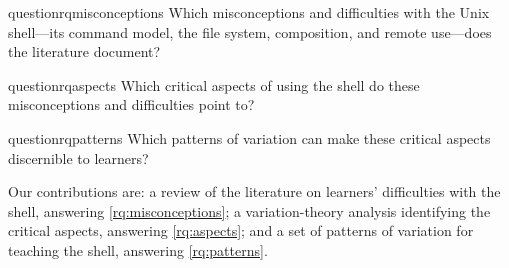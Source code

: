 \begin{frame}
\begin{restatable}{question}{rqmisconceptions}\label{rq:misconceptions}
  Which misconceptions and difficulties with the Unix shell---its command
  model, the file system, composition, and remote use---does the literature
  document?
\end{restatable}

\begin{restatable}{question}{rqaspects}\label{rq:aspects}
  Which critical aspects of using the shell do these misconceptions and
  difficulties point to?
\end{restatable}

\begin{restatable}{question}{rqpatterns}\label{rq:patterns}
  Which patterns of variation can make these critical aspects discernible
  to learners?
\end{restatable}
\end{frame}

Our contributions are:
a review of the literature on learners' difficulties with the shell,
answering \cref{rq:misconceptions};
a variation-theory analysis identifying the critical aspects,
answering \cref{rq:aspects};
and a set of patterns of variation for teaching the shell,
answering \cref{rq:patterns}.

